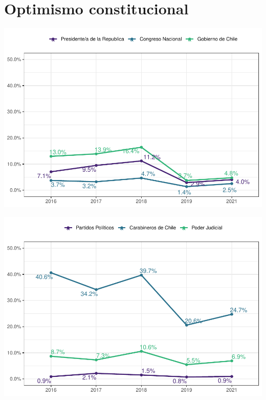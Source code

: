 \documentclass[
  12pt,
]{book}
\begin{document}
\hypertarget{optimismo-constitucional}{%
\section{Optimismo constitucional}\label{optimismo-constitucional}}

\begin{center}\includegraphics{reporte-elsoc_files/figure-latex/unnamed-chunk-14-1} \end{center}

\begin{center}\includegraphics{reporte-elsoc_files/figure-latex/unnamed-chunk-15-1} \end{center}
\end{document}

